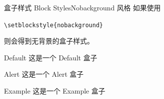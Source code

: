 \documentclass[10pt,aspectratio=169,fontset=none]{ctexbeamer}
\begin{document}
    \begin{frame}{盒子样式 Block Styles}{Nobackground 风格}
    如果使用    

        \begin{center}
            \texttt{\textcolor{primary}{\textbackslash setblockstyle}\{nobackground\}}
        \end{center}
    则会得到无背景的盒子样式。
        \centering
        \begin{minipage}[b]{0.28\textwidth}
            \begin{block}{Default}
                这是一个 Default 盒子
            \end{block}    
        \end{minipage}
        \hspace*{1em}
        \begin{minipage}[b]{0.28\textwidth}
            \begin{alertblock}{Alert}
                这是一个 Alert 盒子
            \end{alertblock}      
        \end{minipage}
        \hspace*{1em}
        \begin{minipage}[b]{0.28\textwidth}
            \begin{exampleblock}{Example}
                这是一个 Example 盒子
            \end{exampleblock}       
        \end{minipage}

    \end{frame}
\end{document}
